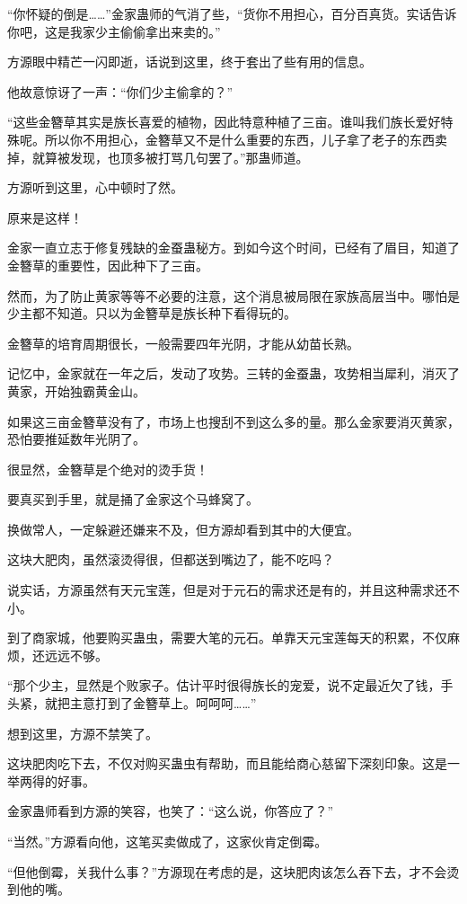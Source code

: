 \begin{this_body}
“你怀疑的倒是……”金家蛊师的气消了些，“货你不用担心，百分百真货。实话告诉你吧，这是我家少主偷偷拿出来卖的。”

方源眼中精芒一闪即逝，话说到这里，终于套出了些有用的信息。

他故意惊讶了一声：“你们少主偷拿的？”

“这些金簪草其实是族长喜爱的植物，因此特意种植了三亩。谁叫我们族长爱好特殊呢。所以你不用担心，金簪草又不是什么重要的东西，儿子拿了老子的东西卖掉，就算被发现，也顶多被打骂几句罢了。”那蛊师道。

方源听到这里，心中顿时了然。

原来是这样！

金家一直立志于修复残缺的金蚕蛊秘方。到如今这个时间，已经有了眉目，知道了金簪草的重要性，因此种下了三亩。

然而，为了防止黄家等等不必要的注意，这个消息被局限在家族高层当中。哪怕是少主都不知道。只以为金簪草是族长种下看得玩的。

金簪草的培育周期很长，一般需要四年光阴，才能从幼苗长熟。

记忆中，金家就在一年之后，发动了攻势。三转的金蚕蛊，攻势相当犀利，消灭了黄家，开始独霸黄金山。

如果这三亩金簪草没有了，市场上也搜刮不到这么多的量。那么金家要消灭黄家，恐怕要推延数年光阴了。

很显然，金簪草是个绝对的烫手货！

要真买到手里，就是捅了金家这个马蜂窝了。

换做常人，一定躲避还嫌来不及，但方源却看到其中的大便宜。

这块大肥肉，虽然滚烫得很，但都送到嘴边了，能不吃吗？

说实话，方源虽然有天元宝莲，但是对于元石的需求还是有的，并且这种需求还不小。

到了商家城，他要购买蛊虫，需要大笔的元石。单靠天元宝莲每天的积累，不仅麻烦，还远远不够。

“那个少主，显然是个败家子。估计平时很得族长的宠爱，说不定最近欠了钱，手头紧，就把主意打到了金簪草上。呵呵呵……”

想到这里，方源不禁笑了。

这块肥肉吃下去，不仅对购买蛊虫有帮助，而且能给商心慈留下深刻印象。这是一举两得的好事。

金家蛊师看到方源的笑容，也笑了：“这么说，你答应了？”

“当然。”方源看向他，这笔买卖做成了，这家伙肯定倒霉。

“但他倒霉，关我什么事？”方源现在考虑的是，这块肥肉该怎么吞下去，才不会烫到他的嘴。

\end{this_body}

